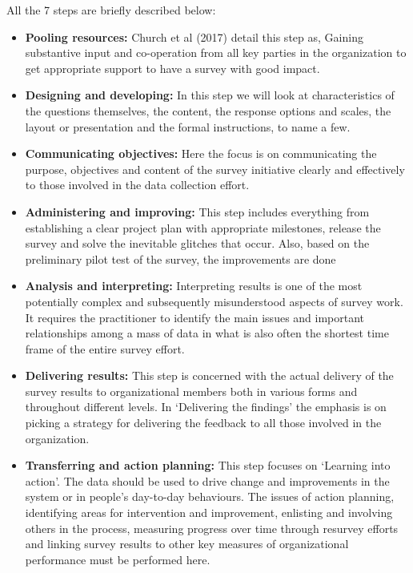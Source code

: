 All the 7 steps are briefly described below:\\

\begin{itemize}
    \item \textbf{Pooling resources:} Church et al (2017) detail this step as, Gaining substantive input and co-operation from all key parties in the organization to get appropriate support to have a survey with good impact.
    \\

    \item \textbf{Designing and developing:} In this step we will look at characteristics of the questions themselves, the content, the response options and scales, the layout or presentation and the formal instructions, to name a few.\\

    \item \textbf{Communicating objectives:} Here the focus is on communicating the purpose, objectives and content of the survey initiative clearly and effectively to those involved in the data collection effort.
\\

    \item \textbf{Administering and improving:} This step includes everything from establishing a clear project plan with appropriate milestones, release the survey and solve the inevitable glitches that occur. Also, based on the preliminary pilot test of the survey, the improvements are done\\

    \item \textbf{Analysis and interpreting:} Interpreting results is one of the most potentially complex and subsequently misunderstood aspects of survey work. It requires the practitioner to identify the main issues and important relationships among a mass of data in what is also often the shortest time frame of the entire survey effort.\\

    \item \textbf{Delivering results:} This step is concerned with the actual delivery of the survey results to organizational members both in various forms and throughout different levels. In ‘Delivering the findings’ the emphasis is on picking a strategy for delivering the feedback to all those involved in the organization.
\\

    \item \textbf{Transferring and action planning:} This step focuses on ‘Learning into action’. The data should be used to drive change and improvements in the system or in people’s day-to-day behaviours. The issues of action planning, identifying areas for intervention and improvement, enlisting and involving others in the process, measuring progress over time through resurvey efforts and linking survey results to other key measures of organizational performance must be performed here.
\\

\end{itemize}
